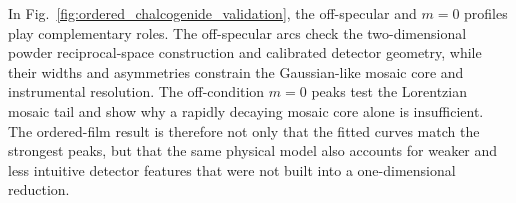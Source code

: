 In Fig.~\ref{fig:ordered_chalcogenide_validation}, the off-specular and $m=0$ profiles play complementary roles. The off-specular arcs check the two-dimensional powder reciprocal-space construction and calibrated detector geometry, while their widths and asymmetries constrain the Gaussian-like mosaic core and instrumental resolution. The off-condition $m=0$ peaks test the Lorentzian mosaic tail and show why a rapidly decaying mosaic core alone is insufficient. The ordered-film result is therefore not only that the fitted curves match the strongest peaks, but that the same physical model also accounts for weaker and less intuitive detector features that were not built into a one-dimensional reduction.
